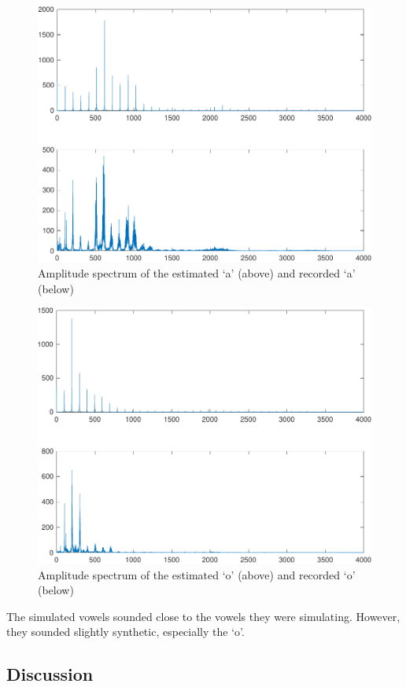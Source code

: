 \documentclass{IEEEtran}
\begin{document}
\begin{figure}[h!]
    \centering
    \captionsetup{justification=centering}
    \includegraphics[width=0.8\columnwidth]{pictures/apreddft.pdf}
    \caption{Amplitude spectrum of the estimated `a' (above) and recorded
    `a' (below)}
    \label{fig:adft}
\end{figure}

\begin{figure}[h!]
    \centering
    \captionsetup{justification=centering}
    \includegraphics[width=0.8\columnwidth]{pictures/opreddft.pdf}
    \caption{Amplitude spectrum of the estimated `o' (above) and recorded
    `o' (below)}
    \label{fig:odft}
\end{figure}

The simulated vowels sounded close to the vowels they were simulating.
However, they sounded slightly synthetic, especially the `o'.

\subsection{Discussion}
\end{document}
